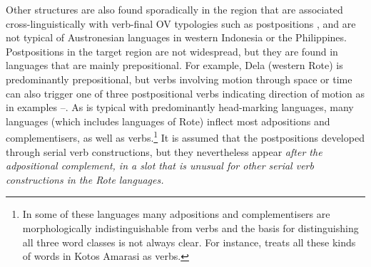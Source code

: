 Other structures are also found sporadically in the region that
are associated cross-linguistically with verb-final OV typologies
such as postpositions \citep{Dryer2013a,Dryer2013f},
and are not typical of Austronesian languages in western Indonesia or the Philippines.
Postpositions in the target region are not widespread,
but they are found in languages that are mainly prepositional.
For example, Dela (western Rote) is predominantly prepositional,
but verbs involving motion through space or time can also trigger
one of three postpositional verbs indicating direction of motion
\citep[291--293]{Tamelan2021} as in examples --.
As is typical with predominantly head-marking languages,
many  languages (which includes languages of
Rote) inflect most adpositions
and complementisers, as well as verbs.\footnote{
		In some of these
		languages many adpositions and complementisers are morphologically indistinguishable from
		verbs and the basis for distinguishing all three word classes is not always clear.
		For instance, \citet{Edwards2020} treats all these kinds
		of words in Kotos Amarasi as verbs.}
It is assumed that the
postpositions developed through serial verb constructions,
but they nevertheless appear \it{after} the adpositional complement,
in a slot that is unusual for other serial verb constructions
in the Rote languages.

\newpage
\begin{exe}
	\vspace{-1mm}
	\label{ex:}
	\label{ex:02-30}
	\label{ex:02-31}
\end{exe}

